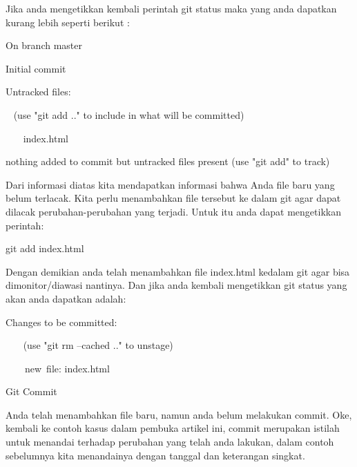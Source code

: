 \noindent 
Jika anda mengetikkan kembali perintah git status maka yang anda dapatkan kurang lebih seperti berikut : \par
\noindent 
On branch master~~~  \par
\noindent 
Initial commit \par
\noindent 
Untracked files: \par
\vspace{\baselineskip}
\noindent 
~  \hspace*{0.5in} (use "git add .." to include in what will be committed) \par
\noindent 
~~~  \hspace*{0.5in} index.html \par
\vspace{\baselineskip}
\noindent 
 \hspace*{0.5in} nothing added to commit but untracked files present (use "git add" to track) \par
\noindent 
Dari informasi diatas kita mendapatkan informasi bahwa Anda file baru yang belum terlacak. Kita perlu menambahkan file tersebut ke dalam git agar dapat dilacak perubahan-perubahan yang terjadi. Untuk itu anda dapat mengetikkan perintah: \par
\vspace{\baselineskip}
\noindent 
 \hspace*{0.5in} git add index.html \par
\noindent 
Dengan demikian anda telah menambahkan file index.html kedalam git agar bisa dimonitor/diawasi nantinya. Dan jika anda kembali mengetikkan git status yang akan anda dapatkan adalah: \par
\vspace{\baselineskip}
\noindent 
 \hspace*{0.5in} Changes to be committed: \par
\noindent 
 \hspace*{0.5in} ~~~ (use "git rm --cached .." to unstage) \par
\noindent 
 \hspace*{0.5in} ~~~~new~file:   index.html \par
 \vspace{\baselineskip}
\noindent 
 \hspace*{0.5in} Git Commit \par
\noindent 
Anda telah menambahkan file baru, namun anda belum melakukan commit. Oke, kembali ke contoh kasus dalam pembuka artikel ini, commit merupakan istilah untuk menandai terhadap perubahan yang telah anda lakukan, dalam contoh sebelumnya kita menandainya dengan tanggal dan keterangan singkat.  \par
